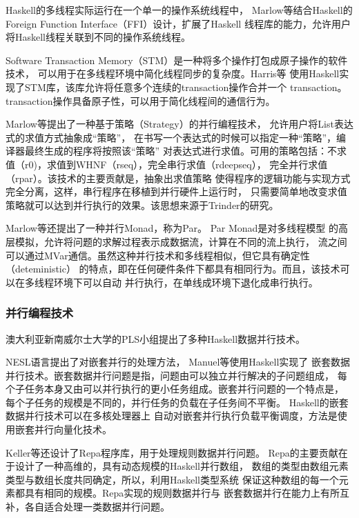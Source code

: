 Haskell的多线程实际运行在一个单一的操作系统线程中，
Marlow等结合Haskell的Foreign Function Interface（FFI）设计，扩展了Haskell
线程库的能力，允许用户将Haskell线程关联到不同的操作系统线程。

Software Transaction Memory（STM）是一种将多个操作打包成原子操作的软件技术，
可以用于在多线程环境中简化线程同步的复杂度。Harris等
使用Haskell实现了STM库，该库允许将任意多个连续的transaction操作合并一个
transaction。transaction操作具备原子性，可以用于简化线程间的通信行为。

Marlow等提出了一种基于策略（Strategy）的并行编程技术，
允许用户将List表达式的求值方式抽象成“策略”，
在书写一个表达式的时候可以指定一种“策略”，编译器最终生成的程序将按照该“策略”
对表达式进行求值。可用的策略包括：不求值（r0)，求值到WHNF（rseq），完全串行求值（rdeepseq），
完全并行求值（rpar）。该技术的主要贡献是，抽象出求值策略
使得程序的逻辑功能与实现方式完全分离，这样，串行程序在移植到并行硬件上运行时，
只需要简单地改变求值策略就可以达到并行执行的效果。该思想来源于Trinder的研究。

Marlow等还提出了一种并行Monad，称为Par。
Par Monad是对多线程模型
的高层模拟，允许将问题的求解过程表示成数据流，计算在不同的流上执行，
流之间可以通过MVar通信。虽然这种并行技术和多线程相似，但它具有确定性（deteministic）
的特点，即在任何硬件条件下都具有相同行为。而且，该技术可以在多线程环境下可以自动
并行执行，在单线成环境下退化成串行执行。

\subsubsection{并行编程技术}
澳大利亚新南威尔士大学的PLS小组提出了多种Haskell数据并行技术。

NESL语言提出了对嵌套并行的处理方法，
Manuel等使用Haskell实现了
嵌套数据并行技术。嵌套数据并行问题是指，问题由可以独立并行解决的子问题组成，
每个子任务本身又由可以并行执行的更小任务组成。嵌套并行问题的一个特点是，
每个子任务的规模是不同的，并行任务的负载在子任务间不平衡。
Haskell的嵌套数据并行技术可以在多核处理器上
自动对嵌套并行执行负载平衡调度，方法是使用嵌套并行向量化技术。

Keller等还设计了Repa程序库，用于处理规则数据并行问题。
Repa的主要贡献在于设计了一种高维的，具有动态规模的Haskell并行数组，
数组的类型由数组元素类型与数组长度共同确定，所以，利用Haskell类型系统
保证这种数组的每一个元素都具有相同的规模。Repa实现的规则数据并行与
嵌套数据并行在能力上有所互补，各自适合处理一类数据并行问题。

